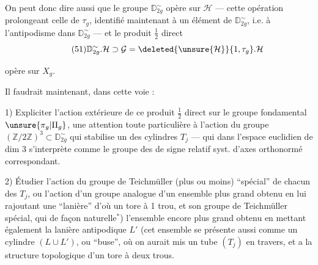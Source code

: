 On peut donc dire aussi que le groupe $\mathbb D_{2g}^\sim$
opère sur $\mathcal H$ --- cette opération prolongeant celle
de $\tau_g$, identifié maintenant à un
élément de $\mathbb D_{2g}^\sim$, i.e. à l'antipodisme dans
$\mathbb D_{2g}^\sim$ --- et le produit $\frac12$ direct
\[
\tag{51}
\mathbb D_{2g}^\sim.\mathcal H\supset\mathcal G
=\deleted{\unsure{\mathcal H}}\{1,\tau_g\}.\mathcal H
\]



opère sur $X_g$.

Il faudrait maintenant, dans cette voie :

1) Expliciter l'action extérieure de ce produit $\frac12$ direct sur le groupe fondamental $\unsure{\pi_g|\Pi_g}$,  une attention toute particulière à l'action du groupe $(\mathbb Z/2\mathbb Z)^3\subset\mathbb D_{2g}^{\sim}$ qui stabilise un des cylindres $T_j$ --- qui dans l'espace euclidien de dim 3 s'interprète comme le groupe des  de signe relatif  syst. d'axes orthonormé correspondant.

2) Étudier l'action  du groupe de Teichmüller (plus ou moins) ``spécial'' de chacun des $T_j$, ou l'action d'un groupe analogue d'un ensemble plus grand obtenu en lui rajoutant une ``lanière''  d'où un tore à 1 trou, et son groupe de Teichmüller spécial, qui  de façon naturelle$^*$)  l'ensemble encore plus grand obtenu en mettant également la lanière antipodique $L'$ (cet ensemble se présente aussi comme un cylindre $(L\cup L')$, ou ``buse'', où on aurait mis un tube $(T_j)$ en travers, et a la structure topologique d'un tore à deux trous.


